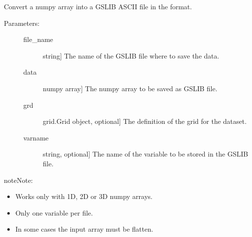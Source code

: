 \documentclass[letterpaper,10pt,english]{sphinxmanual}
\begin{document}
\begin{fulllineitems}
\label{\detokenize{appendices:s2Dcd.gslibnumpy.numpy2dat}}
Convert a numpy array into a GSLIB ASCII file in the  format.
\begin{description}
\item[{Parameters:}] \leavevmode\begin{description}
\item[{file\_name}] \leavevmode{[}string{]}
The name of the GSLIB file where to save the data.

\item[{data}] \leavevmode{[}numpy array{]}
The numpy array to be saved as GSLIB file.

\item[{grd}] \leavevmode{[}grid.Grid object, optional{]}
The definition of the grid for the dataset.

\item[{varname}] \leavevmode{[}string, optional{]}
The name of the variable to be stored in the GSLIB file.

\end{description}

\end{description}

\begin{sphinxadmonition}{note}{Note:}\begin{itemize}
\item {} 
Works only with 1D, 2D or 3D numpy arrays.

\item {} 
Only one variable per file.

\item {} 
In some cases the input array must be flatten.

\end{itemize}
\end{sphinxadmonition}

\end{fulllineitems}

\end{document}
